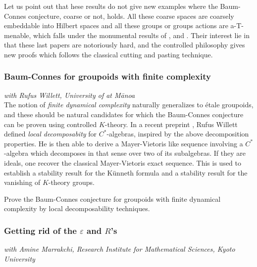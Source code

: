 Let us point out that hese results do not give new examples where the Baum-Connes conjecture, coarse or not, holds. All these coarse spaces are coarsely embeddable into Hilbert spaces and all these groups or groups actions are a-T-menable, which falls under the monumental results of \cite{HigsonKasparov}, \cite{TuThese} and \cite{Yu2}. Their interest lie in that these last papers are notoriously hard, and the controlled philosophy gives new proofs which follows the classical cutting and pasting technique.\\  

\subsubsection*{Baum-Connes for groupoids with finite complexity}
  
\textit{with Rufus Willett, University of \Hawaii at M\={a}noa}\\

The notion of \textit{finite dynamical complexity} naturally generalizes to \'etale groupoids, and these should be natural candidates for which the Baum-Connes conjecture can be proven using controlled $K$-theory. In a recent preprint \cite{willett2019decompositions}, Rufus Willett defined \textit{local decomposabity} for $C^*$-algebras, inspired by the above decomposition properties. He is then able to derive a Mayer-Vietoris like sequence involving a $C^*$-algebra which decomposes in that sense over two of its subalgebras. If they are ideals, one recover the classical Mayer-Vietoris exact sequence. This is used to establish a stability result for the K\"unneth formula and a stability result for the vanishing of $K$-theory groups.

\begin{project}
Prove the Baum-Connes conjecture for groupoids with finite dynamical complexity by local decomposability techniques.  
\end{project} 


\subsubsection*{Getting rid of the $\varepsilon$ and $R$'s}

\textit{with Amine Marrakchi, Research Institute for Mathematical Sciences, Kyoto University}\\

